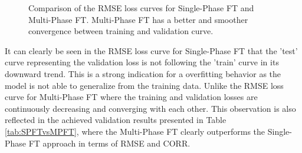 \begin{figure}[H]
  \centering
  \hfill
  \caption[Ablation study: Multi-Phase FT loss curves]{Comparison of the RMSE loss curves for Single-Phase FT and Multi-Phase FT. Multi-Phase FT has a better and smoother convergence between training and validation curve.}
  \label{fig:SPFTvsMPFT}
\end{figure}

It can clearly be seen in the RMSE loss curve for Single-Phase FT that the 'test' curve representing the validation loss is not following the 'train' curve in its downward trend. This is a strong indication for a overfitting behavior as the model is not able to generalize from the training data. Unlike the RMSE loss curve for Multi-Phase FT where the training and validation losses are continuously decreasing and converging with each other. This observation is also reflected in the achieved validation results presented in Table \ref{tab:SPFTvsMPFT}, where the Multi-Phase FT clearly outperforms the Single-Phase FT approach in terms of RMSE and CORR.

